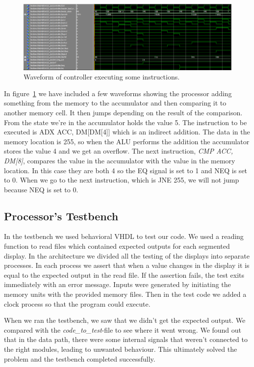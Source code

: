 \documentclass[a4,11pt]{article}
\begin{document}
\begin{figure}[h!]
	\centering
	\includegraphics[width=1\textwidth]{Figurer/controller}
	\caption{Waveform of controller executing some instructions.}
	\label{fig:con}
\end{figure}
\newpage
In figure~\ref{fig:con} we have included a few waveforms showing the processor adding something 
from the memory to the accumulator and then comparing it to another memory cell. It then jumps 
depending on the result of the comparison. From the state we're in the accumulator holds the value 5. 
The instruction to be executed is ADX ACC, DM[DM[4]] which is an indirect addition. The data in the 
memory location is 255, so when the ALU performs the addition the accumulator stores the value 4 and 
we get an overflow. The next instruction, \emph{CMP ACC, DM[8]}, compares the value in the accumulator 
with the value in the memory location. In this case they are both 4 so the EQ signal is set to 1 and 
NEQ is set to 0. When we go to the next instruction, which is JNE 255, we will not jump because NEQ is 
set to 0.

\subsection{Processor's Testbench}

In the testbench we used behavioral VHDL to test our code. We used a reading function to read files which
contained expected outputs for each segmented display. In the architecture we divided all the testing 
of the displays into separate processes. In each process we assert that when a value changes in the display
it is equal to the expected output in the read file. If the assertion fails, the test exits immediately 
with an error message. Inputs were generated by initiating the memory units with the provided memory files.
Then in the test code we added a clock process so that the program could execute.

When we ran the testbench, we saw that we didn't get the expected output. We compared with the
{\it code\_to\_test}-file to see where it went wrong. We found out that in the data path, there were some internal
signals that weren't connected to the right modules, leading to unwanted behaviour. This ultimately solved the
problem and the testbench completed successfully.
\end{document}
